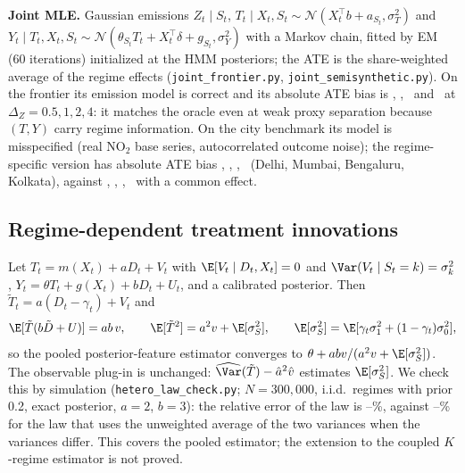 \textbf{Joint MLE.} Gaussian emissions $Z_t\mid S_t$, $T_t\mid X_t,S_t\sim\mathcal N(X_t^\top b+a_{S_t},\sigma_T^2)$ and $Y_t\mid T_t,X_t,S_t\sim\mathcal N(\theta_{S_t}T_t+X_t^\top\delta+g_{S_t},\sigma_Y^2)$ with a Markov chain, fitted by EM (60 iterations) initialized at the HMM posteriors; the ATE is the share-weighted average of the regime effects (\texttt{joint\_frontier.py}, \texttt{joint\_semisynthetic.py}). On the frontier its emission model is correct and its absolute ATE bias is \RbJFHalf, \RbJFOne, \RbJFTwo\ and \RbJFFour\ at $\Delta_Z=0.5,1,2,4$: it matches the oracle even at weak proxy separation because $(T,Y)$ carry regime information. On the city benchmark its model is misspecified (real NO$_2$ base series, autocorrelated outcome noise); the regime-specific version has absolute ATE bias \RbJCityDelhi, \RbJCityMumbai, \RbJCityBengaluru, \RbJCityKolkata\ (Delhi, Mumbai, Bengaluru, Kolkata), against \RbJCommonCityDelhi, \RbJCommonCityMumbai, \RbJCommonCityBengaluru, \RbJCommonCityKolkata\ with a common effect.

\subsection{Regime-dependent treatment innovations}
Let $T_t=m(X_t)+aD_t+V_t$ with $\E[V_t\mid D_t,X_t]=0$ and $\Var(V_t\mid S_t=k)=\sigma_k^2$, $Y_t=\theta T_t+g(X_t)+bD_t+U_t$, and a calibrated posterior. Then $\tilde T_t=a(D_t-\gamma_t)+V_t$ and
\[
\E[\tilde T(b\tilde D+U)]=ab\,v,\qquad \E[\tilde T^2]=a^2v+\E[\sigma_S^2],\qquad \E[\sigma_S^2]=\E[\gamma_t\sigma_1^2+(1-\gamma_t)\sigma_0^2],
\]
so the pooled posterior-feature estimator converges to $\theta+abv/(a^2v+\E[\sigma_S^2])$. The observable plug-in is unchanged: $\widehat{\Var}(\tilde T)-\hat a^2\hat v$ estimates $\E[\sigma_S^2]$. We check this by simulation (\texttt{hetero\_law\_check.py}; $N=300{,}000$, i.i.d.\ regimes with prior 0.2, exact posterior, $a=2$, $b=3$): the relative error of the law is \RbHetErrMin--\RbHetErrMax\%, against \RbHomErrMin--\RbHomErrMax\% for the law that uses the unweighted average of the two variances when the variances differ. This covers the pooled estimator; the extension to the coupled $K$-regime estimator is not proved.
\begin{table}[h]\centering\footnotesize
\caption{Pooled bias with regime-dependent treatment innovations: measured bias, the law with $\E[\sigma_S^2]$, and the law with the unweighted average variance $\bar\sigma^2=(\sigma_0^2+\sigma_1^2)/2$ (\texttt{reports/rebuttal/hetero\_law\_check.csv}).}\label{tab:hetero}

\end{table}

